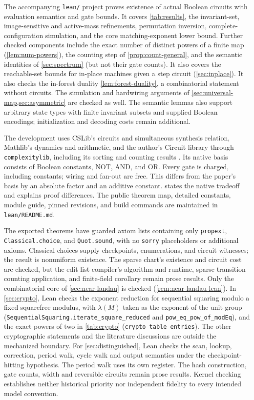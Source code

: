 \documentclass[11pt]{article}
\theoremstyle{definition}
\theoremstyle{remark}
\numberwithin{equation}{section}
\begin{document}
The accompanying \texttt{lean/} project proves existence of actual Boolean
circuits with evaluation semantics and gate bounds.  It covers
\cref{tab:results}, the invariant-set, image-sensitive and active-mass
refinements, permutation inversion, complete-configuration simulation,
and the core matching-exponent lower bound.  Further checked components
include the exact number of distinct powers of a finite map
(\cref{lem:num-powers}), the counting step of \cref{prop:count-general},
and the semantic identities of
\cref{sec:spectrum} (but not their gate counts).  It also covers the reachable-set bounds for in-place machines given a step
circuit (\cref{sec:inplace}).  It also checks the in-forest duality
\cref{lem:forest-duality}, a combinatorial statement without circuits.
The simulation and hardwiring arguments of
\cref{sec:universal-map,sec:asymmetric} are checked as well.
The semantic lemmas also support arbitrary
state types with finite invariant subsets and supplied Boolean encodings;
initialization and decoding costs remain additional.

The development uses CSLib's circuits and simultaneous synthesis relation,
Mathlib's dynamics and arithmetic, and the author's Circuit library through
\texttt{complexitylib}, including its sorting and counting results
\cite{CSLib,Mathlib,Complexitylib}.  Its native basis consists of Boolean
constants, NOT, AND, and OR.  Every gate is charged, including constants;
wiring and fan-out are free.  This differs from the paper's basis by an
absolute factor and an additive constant.
 states the native tradeoff and explains proof
differences.  The public theorem map, detailed constants, module guide,
pinned revisions, and build commands are maintained in \texttt{lean/README.md}.

The exported theorems have guarded axiom lists containing only
\texttt{propext}, \texttt{Classical.choice}, and \texttt{Quot.sound}, with no
\texttt{sorry} placeholders or additional axioms.  Classical choices supply
checkpoints, enumerations, and circuit witnesses; the result is nonuniform
existence.  The sparse chart's existence and circuit cost are checked, but
the edit-list compiler's algorithm and runtime, sparse-transition counting
application, and finite-field corollary remain prose results.  Only
the combinatorial core of \cref{sec:near-landau} is checked
(\cref{rem:near-landau-lean}).  In
\cref{sec:crypto}, Lean checks the exponent reduction for sequential
squaring modulo a fixed squarefree modulus, with $\lambda(M)$ taken as
the exponent of the unit group
(\texttt{SequentialSquaring.iterate\_square\_reduced} and
\texttt{pow\_eq\_pow\_of\_modEq}), and the exact powers of two in
\cref{tab:crypto} (\texttt{crypto\_table\_entries}).  The other
cryptographic statements and the literature discussions are outside the
mechanized boundary.  For \cref{sec:distinguished}, Lean checks the scan, lookup, correction,
period walk, cycle walk and output semantics under the checkpoint-hitting
hypothesis.  The period walk uses its own register.  The hash construction,
gate counts, width and reversible circuits remain prose results.
Kernel checking establishes neither historical priority nor
independent fidelity to every intended model convention.
\end{document}
